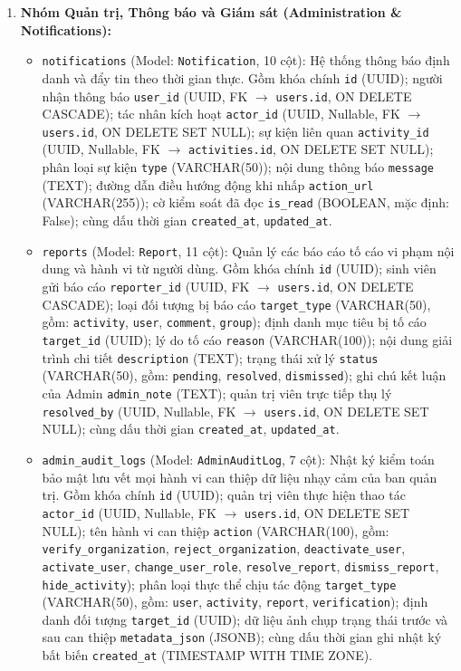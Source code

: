 \begin{enumerate}
    \item \textbf{Nhóm Quản trị, Thông báo và Giám sát (Administration \& Notifications):}
    \begin{itemize}
        \item \texttt{notifications} (Model: \texttt{Notification}, 10 cột): Hệ thống thông báo định danh và đẩy tin theo thời gian thực. Gồm khóa chính \texttt{id} (UUID); người nhận thông báo \texttt{user\_id} (UUID, FK $\rightarrow$ \texttt{users.id}, ON DELETE CASCADE); tác nhân kích hoạt \texttt{actor\_id} (UUID, Nullable, FK $\rightarrow$ \texttt{users.id}, ON DELETE SET NULL); sự kiện liên quan \texttt{activity\_id} (UUID, Nullable, FK $\rightarrow$ \texttt{activities.id}, ON DELETE SET NULL); phân loại sự kiện \texttt{type} (VARCHAR(50)); nội dung thông báo \texttt{message} (TEXT); đường dẫn điều hướng động khi nhấp \texttt{action\_url} (VARCHAR(255)); cờ kiểm soát đã đọc \texttt{is\_read} (BOOLEAN, mặc định: False); cùng dấu thời gian \texttt{created\_at}, \texttt{updated\_at}.
        \item \texttt{reports} (Model: \texttt{Report}, 11 cột): Quản lý các báo cáo tố cáo vi phạm nội dung và hành vi từ người dùng. Gồm khóa chính \texttt{id} (UUID); sinh viên gửi báo cáo \texttt{reporter\_id} (UUID, FK $\rightarrow$ \texttt{users.id}, ON DELETE CASCADE); loại đối tượng bị báo cáo \texttt{target\_type} (VARCHAR(50), gồm: \texttt{activity}, \texttt{user}, \texttt{comment}, \texttt{group}); định danh mục tiêu bị tố cáo \texttt{target\_id} (UUID); lý do tố cáo \texttt{reason} (VARCHAR(100)); nội dung giải trình chi tiết \texttt{description} (TEXT); trạng thái xử lý \texttt{status} (VARCHAR(50), gồm: \texttt{pending}, \texttt{resolved}, \texttt{dismissed}); ghi chú kết luận của Admin \texttt{admin\_note} (TEXT); quản trị viên trực tiếp thụ lý \texttt{resolved\_by} (UUID, Nullable, FK $\rightarrow$ \texttt{users.id}, ON DELETE SET NULL); cùng dấu thời gian \texttt{created\_at}, \texttt{updated\_at}.
        \item \texttt{admin\_audit\_logs} (Model: \texttt{AdminAuditLog}, 7 cột): Nhật ký kiểm toán bảo mật lưu vết mọi hành vi can thiệp dữ liệu nhạy cảm của ban quản trị. Gồm khóa chính \texttt{id} (UUID); quản trị viên thực hiện thao tác \texttt{actor\_id} (UUID, Nullable, FK $\rightarrow$ \texttt{users.id}, ON DELETE SET NULL); tên hành vi can thiệp \texttt{action} (VARCHAR(100), gồm: \texttt{verify\_organization}, \texttt{reject\_organization}, \texttt{deactivate\_user}, \texttt{activate\_user}, \texttt{change\_user\_role}, \texttt{resolve\_report}, \texttt{dismiss\_report}, \texttt{hide\_activity}); phân loại thực thể chịu tác động \texttt{target\_type} (VARCHAR(50), gồm: \texttt{user}, \texttt{activity}, \texttt{report}, \texttt{verification}); định danh đối tượng \texttt{target\_id} (UUID); dữ liệu ảnh chụp trạng thái trước và sau can thiệp \texttt{metadata\_json} (JSONB); cùng dấu thời gian ghi nhật ký bất biến \texttt{created\_at} (TIMESTAMP WITH TIME ZONE).
    \end{itemize}
\end{enumerate}

